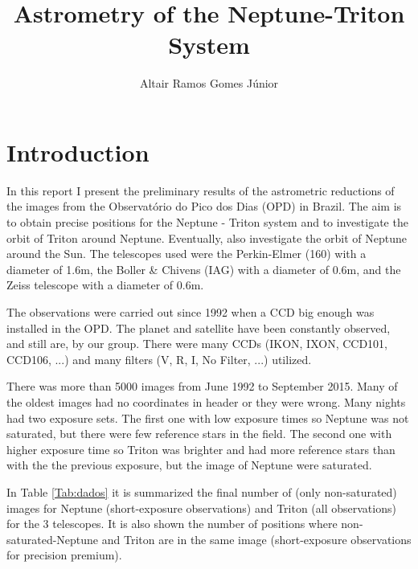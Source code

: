 \documentclass[12pt,a4paper]{report}
\author{Altair Ramos Gomes Júnior}
\title{Astrometry of the Neptune-Triton System}
\newcommand{\PE}{Perkin-Elmer }
\newcommand{\BC}{Boller \& Chivens }
\begin{document}
\maketitle

\pagestyle{headings}

\section*{Introduction}

In this report I present the preliminary results of the astrometric reductions of the images from the Observatório do Pico dos Dias (OPD) in Brazil. The aim is to obtain precise positions for the Neptune - Triton system and to investigate the orbit of Triton around Neptune. Eventually, also investigate the orbit of Neptune around the Sun. The telescopes used were the \PE (160) with a diameter of 1.6m, the \BC (IAG) with a diameter of 0.6m, and the Zeiss telescope with a diameter of 0.6m.

The observations were carried out since 1992 when a CCD big enough was installed in the OPD. The planet and satellite have been constantly observed, and still are, by our group. There were many CCDs (IKON, IXON, CCD101, CCD106, ...) and many filters (V, R, I, No Filter, ...) utilized.

There was more than 5000 images from June 1992 to September 2015. Many of the oldest images had no coordinates in header or they were wrong. Many nights had two exposure sets. The first one with low exposure times so Neptune was not saturated, but there were few reference stars in the field. The second one with higher exposure time so Triton was brighter and had more reference stars than with the the previous exposure, but the image of Neptune were saturated.

In Table \ref{Tab:dados} it is summarized the final number of (only non-saturated) images for Neptune (short-exposure observations) and Triton (all observations) for the 3 telescopes. It is also shown the number of positions where non-saturated-Neptune and Triton are in the same image (short-exposure observations for precision premium).
\end{document}
